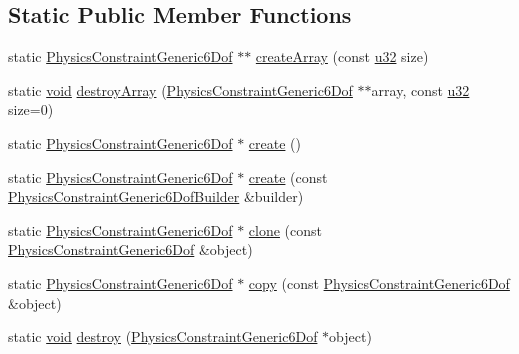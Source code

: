 \subsection*{Static Public Member Functions}
\begin{DoxyCompactItemize}
\item 
static \mbox{\hyperlink{classnjli_1_1_physics_constraint_generic6_dof}{Physics\+Constraint\+Generic6\+Dof}} $\ast$$\ast$ \mbox{\hyperlink{classnjli_1_1_physics_constraint_generic6_dof_a381a2088b01e0250c34d2da797df64aa}{create\+Array}} (const \mbox{\hyperlink{_util_8h_a10e94b422ef0c20dcdec20d31a1f5049}{u32}} size)
\item 
static \mbox{\hyperlink{_thread_8h_af1e856da2e658414cb2456cb6f7ebc66}{void}} \mbox{\hyperlink{classnjli_1_1_physics_constraint_generic6_dof_a5c3c7a6da2d13eccde2f45ac66624cb8}{destroy\+Array}} (\mbox{\hyperlink{classnjli_1_1_physics_constraint_generic6_dof}{Physics\+Constraint\+Generic6\+Dof}} $\ast$$\ast$array, const \mbox{\hyperlink{_util_8h_a10e94b422ef0c20dcdec20d31a1f5049}{u32}} size=0)
\item 
static \mbox{\hyperlink{classnjli_1_1_physics_constraint_generic6_dof}{Physics\+Constraint\+Generic6\+Dof}} $\ast$ \mbox{\hyperlink{classnjli_1_1_physics_constraint_generic6_dof_a9127a08a4c28e717357b9f38ae4d2aa0}{create}} ()
\item 
static \mbox{\hyperlink{classnjli_1_1_physics_constraint_generic6_dof}{Physics\+Constraint\+Generic6\+Dof}} $\ast$ \mbox{\hyperlink{classnjli_1_1_physics_constraint_generic6_dof_a3a1107170a0d064424b00f49f16dcf67}{create}} (const \mbox{\hyperlink{classnjli_1_1_physics_constraint_generic6_dof_builder}{Physics\+Constraint\+Generic6\+Dof\+Builder}} \&builder)
\item 
static \mbox{\hyperlink{classnjli_1_1_physics_constraint_generic6_dof}{Physics\+Constraint\+Generic6\+Dof}} $\ast$ \mbox{\hyperlink{classnjli_1_1_physics_constraint_generic6_dof_a75cf11aab13266cac631ea51d084c2d2}{clone}} (const \mbox{\hyperlink{classnjli_1_1_physics_constraint_generic6_dof}{Physics\+Constraint\+Generic6\+Dof}} \&object)
\item 
static \mbox{\hyperlink{classnjli_1_1_physics_constraint_generic6_dof}{Physics\+Constraint\+Generic6\+Dof}} $\ast$ \mbox{\hyperlink{classnjli_1_1_physics_constraint_generic6_dof_afb151ae4e2a88a7ee3f92ea035497773}{copy}} (const \mbox{\hyperlink{classnjli_1_1_physics_constraint_generic6_dof}{Physics\+Constraint\+Generic6\+Dof}} \&object)
\item 
static \mbox{\hyperlink{_thread_8h_af1e856da2e658414cb2456cb6f7ebc66}{void}} \mbox{\hyperlink{classnjli_1_1_physics_constraint_generic6_dof_a9284dc403064bdfbc2cee6a713b070c4}{destroy}} (\mbox{\hyperlink{classnjli_1_1_physics_constraint_generic6_dof}{Physics\+Constraint\+Generic6\+Dof}} $\ast$object)

\end{DoxyCompactItemize}
